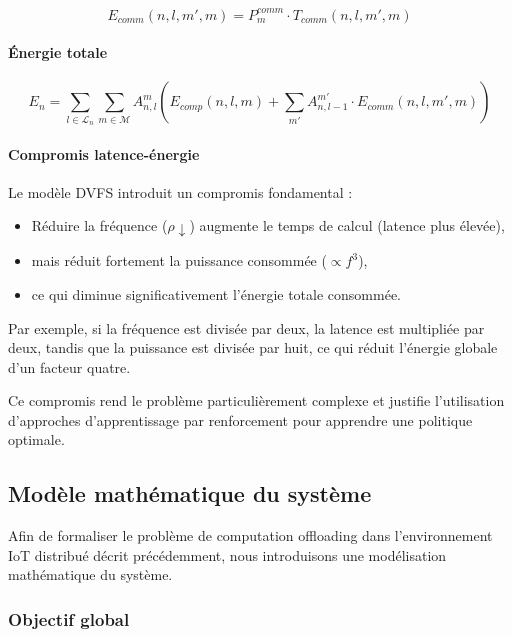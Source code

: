 \documentclass[12pt,a4paper]{report}
\begin{document}
\begin{equation}
E_{comm}(n,l,m',m) = P_m^{comm} \cdot T_{comm}(n,l,m',m)
\end{equation}

\paragraph{Énergie totale}

\begin{equation}
E_n = \sum_{l \in \mathcal{L}_n} \sum_{m \in \mathcal{M}} A_{n,l}^m 
\left( E_{comp}(n,l,m) + \sum_{m'} A_{n,l-1}^{m'} \cdot E_{comm}(n,l,m',m) \right)
\end{equation}

\paragraph{Compromis latence-énergie}

Le modèle DVFS introduit un compromis fondamental :

\begin{itemize}
    \item Réduire la fréquence ($\rho \downarrow$) augmente le temps de calcul (latence plus élevée),
    \item mais réduit fortement la puissance consommée ($\propto f^3$),
    \item ce qui diminue significativement l’énergie totale consommée.
\end{itemize}

Par exemple, si la fréquence est divisée par deux, la latence est multipliée par deux, tandis que la puissance est divisée par huit, ce qui réduit l’énergie globale d’un facteur quatre.

Ce compromis rend le problème particulièrement complexe et justifie l’utilisation d’approches d’apprentissage par renforcement pour apprendre une politique optimale.

\subsection{Modèle mathématique du système}

Afin de formaliser le problème de computation offloading dans l’environnement IoT distribué décrit précédemment, nous introduisons une modélisation mathématique du système.

\subsubsection{Objectif global}
\end{document}
